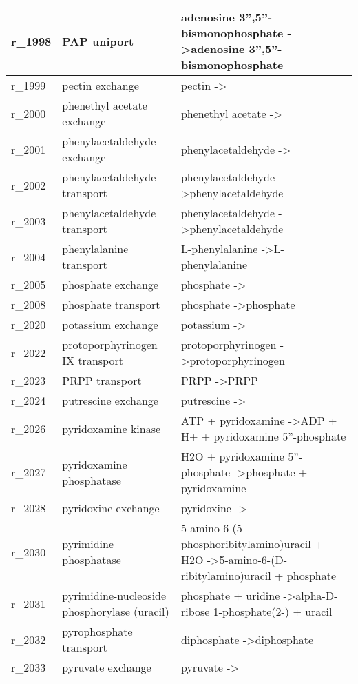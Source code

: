 \begin{landscape}
{\begin{longtable}{|l|p{7cm}|p{15cm}|}
r\_1998 & PAP uniport & adenosine 3'',5''-bismonophosphate  -\textgreater adenosine 3'',5''-bismonophosphate \\ \hline
r\_1999 & pectin exchange & pectin  -\textgreater{} \\ \hline
r\_2000 & phenethyl acetate exchange & phenethyl acetate  -\textgreater{} \\ \hline
r\_2001 & phenylacetaldehyde exchange & phenylacetaldehyde  -\textgreater{} \\ \hline
r\_2002 & phenylacetaldehyde transport & phenylacetaldehyde  -\textgreater phenylacetaldehyde \\ \hline
r\_2003 & phenylacetaldehyde transport & phenylacetaldehyde  -\textgreater phenylacetaldehyde \\ \hline
r\_2004 & phenylalanine transport & L-phenylalanine  -\textgreater L-phenylalanine \\ \hline
r\_2005 & phosphate exchange & phosphate  -\textgreater{} \\ \hline
r\_2008 & phosphate transport & phosphate  -\textgreater phosphate \\ \hline
r\_2020 & potassium exchange & potassium  -\textgreater{} \\ \hline
r\_2022 & protoporphyrinogen IX transport & protoporphyrinogen  -\textgreater protoporphyrinogen \\ \hline
r\_2023 & PRPP transport & PRPP  -\textgreater PRPP \\ \hline
r\_2024 & putrescine exchange & putrescine  -\textgreater{} \\ \hline
r\_2026 & pyridoxamine kinase & ATP + pyridoxamine  -\textgreater ADP + H+ + pyridoxamine 5''-phosphate \\ \hline
r\_2027 & pyridoxamine phosphatase & H2O + pyridoxamine 5''-phosphate  -\textgreater phosphate + pyridoxamine \\ \hline
r\_2028 & pyridoxine exchange & pyridoxine  -\textgreater{} \\ \hline
r\_2030 & pyrimidine phosphatase & 5-amino-6-(5-phosphoribitylamino)uracil + H2O  -\textgreater 5-amino-6-(D-ribitylamino)uracil + phosphate \\ \hline
r\_2031 & pyrimidine-nucleoside phosphorylase (uracil) & phosphate + uridine  -\textgreater alpha-D-ribose 1-phosphate(2-) + uracil \\ \hline
r\_2032 & pyrophosphate transport & diphosphate  -\textgreater diphosphate \\ \hline
r\_2033 & pyruvate exchange & pyruvate  -\textgreater{} \\ \hline

\end{longtable}}
\end{landscape}
